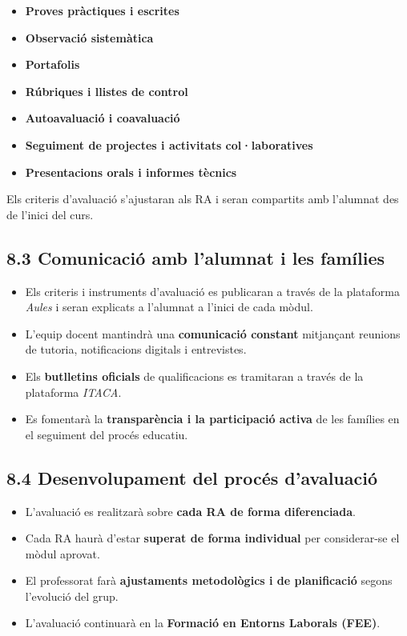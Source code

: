 \documentclass[
  paper=a4,
  ,captions=tableheading
]{scrartcl}
\providecommand{\tightlist}{%
  \setlength{\itemsep}{0pt}\setlength{\parskip}{0pt}}
\begin{document}
\begin{itemize}
\tightlist
\item
  \textbf{Proves pràctiques i escrites}
\item
  \textbf{Observació sistemàtica}
\item
  \textbf{Portafolis}
\item
  \textbf{Rúbriques i llistes de control}
\item
  \textbf{Autoavaluació i coavaluació}
\item
  \textbf{Seguiment de projectes i activitats col·laboratives}
\item
  \textbf{Presentacions orals i informes tècnics}
\end{itemize}

Els criteris d'avaluació s'ajustaran als RA i seran compartits amb
l'alumnat des de l'inici del curs.

\hypertarget{comunicaciuxf3-amb-lalumnat-i-les-famuxedlies}{%
\subsection{8.3 Comunicació amb l'alumnat i les
famílies}\label{comunicaciuxf3-amb-lalumnat-i-les-famuxedlies}}

\begin{itemize}
\tightlist
\item
  Els criteris i instruments d'avaluació es publicaran a través de la
  plataforma \emph{Aules} i seran explicats a l'alumnat a l'inici de
  cada mòdul.
\item
  L'equip docent mantindrà una \textbf{comunicació constant} mitjançant
  reunions de tutoria, notificacions digitals i entrevistes.
\item
  Els \textbf{butlletins oficials} de qualificacions es tramitaran a
  través de la plataforma \emph{ITACA}.
\item
  Es fomentarà la \textbf{transparència i la participació activa} de les
  famílies en el seguiment del procés educatiu.
\end{itemize}

\hypertarget{desenvolupament-del-procuxe9s-davaluaciuxf3}{%
\subsection{8.4 Desenvolupament del procés
d'avaluació}\label{desenvolupament-del-procuxe9s-davaluaciuxf3}}

\begin{itemize}
\tightlist
\item
  L'avaluació es realitzarà sobre \textbf{cada RA de forma
  diferenciada}.
\item
  Cada RA haurà d'estar \textbf{superat de forma individual} per
  considerar-se el mòdul aprovat.
\item
  El professorat farà \textbf{ajustaments metodològics i de
  planificació} segons l'evolució del grup.
\item
  L'avaluació continuarà en la \textbf{Formació en Entorns Laborals
  (FEE)}.
\end{itemize}
\end{document}
